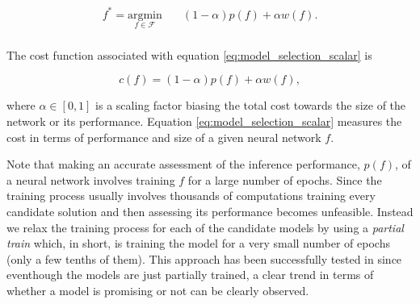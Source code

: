 \documentclass[journal]{IEEEtran}
\begin{document}
\begin{equation}
\begin{aligned}
	f^* = \underset{f \in \mathcal{F}}{\text{argmin}}
	& \quad (1-\alpha)p(f) + \alpha w(f).\\
\end{aligned}
\label{eq:model_selection_scalar}
\end{equation}

The cost function associated with equation \ref{eq:model_selection_scalar} is

\begin{equation}
c(f) = (1-\alpha)p(f) + \alpha w(f), 
\label{eq:fitness_function_scalar}
\end{equation}

where $\alpha \in \left[0,1\right]$ is a scaling factor biasing the total cost towards the size of the network or its performance. Equation \ref{eq:model_selection_scalar} measures the cost in terms of performance and size of a given neural network $f$.

Note that making an accurate assessment of the inference performance, $p(f)$, of a neural network involves training $f$ for a large number of epochs. Since the training process usually involves thousands of computations training every candidate solution and then assessing its performance becomes unfeasible. Instead we relax the training process for each of the candidate models by using a \textit{partial train} which, in short, is training the model for a very small number of epochs (only a few tenths of them). This approach has been successfully tested in \cite{Laredo2018} since eventhough the models are just partially trained, a clear trend in terms of whether a model is promising or not can be clearly observed.
\end{document}
